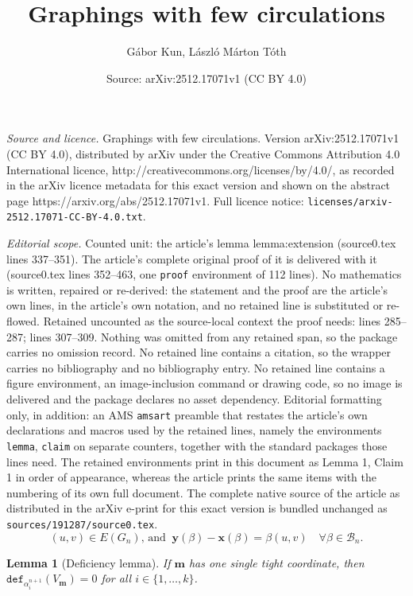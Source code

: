 \documentclass[10pt,a4paper]{amsart}
\title{Graphings with few circulations}
\author{G\'abor Kun, L\'aszl\'o M\'arton T\'oth}
\date{Source: arXiv:2512.17071v1 (CC BY 4.0)}
\newtheorem{lemma}{Lemma}
\begin{document}
\maketitle

\noindent\emph{Source and licence.} Graphings with few circulations. Version arXiv:2512.17071v1 (CC BY 4.0), distributed by arXiv under the Creative Commons Attribution 4.0 International licence, http://creativecommons.org/licenses/by/4.0/, as recorded in the arXiv licence metadata for this exact version and shown on the abstract page https://arxiv.org/abs/2512.17071v1. Full licence notice: \texttt{licenses/arxiv-2512.17071-CC-BY-4.0.txt}.\par\smallskip

\noindent\textit{Editorial scope.} Counted unit: the article's lemma lemma:extension (source0.tex lines 337--351). The article's complete original proof of it is delivered with it (source0.tex lines 352--463, one \texttt{proof} environment of 112 lines). No mathematics is written, repaired or re-derived: the statement and the proof are the article's own lines, in the article's own notation, and no retained line is substituted or re-flowed.  Retained uncounted as the source-local context the proof needs: lines 285--287; lines 307--309.  Nothing was omitted from any retained span, so the package carries no omission record.  No retained line contains a citation, so the wrapper carries no bibliography and no bibliography entry.  No retained line contains a figure environment, an image-inclusion command or drawing code, so no image is delivered and the package declares no asset dependency.  Editorial formatting only, in addition: an AMS \texttt{amsart} preamble that restates the article's own declarations and macros used by the retained lines, namely the environments \texttt{lemma}, \texttt{claim} on separate counters, together with the standard packages those lines need.  The retained environments print in this document as Lemma 1, Claim 1 in order of appearance, whereas the article prints the same items with the numbering of its own full document.  The complete native source of the article as distributed in the arXiv e-print for this exact version is bundled unchanged as \texttt{sources/191287/source0.tex}.
\begin{equation} \label{eqn:edge_lift}
(u,v) \in E(G_n) \textrm{, and } \ \mathbf{y}(\beta)- \mathbf{x}(\beta) = \beta(u,v) \quad \forall \beta \in \mathcal{B}_n.
\end{equation}

\begin{lemma}[Deficiency lemma] \label{lemma:deficiency}
    If $\textbf{m}$ has one single tight coordinate, then $\texttt{def}_{\alpha^{n+1}_i}(V_{\mathbf{m}}) =0$ for all $i \in \{1,\ldots, k\}$. 
\end{lemma}
\end{document}
